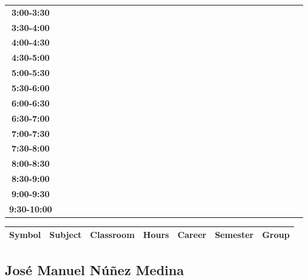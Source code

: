\documentclass{article}
\begin{document}
\begin{table}[ht]
\begin{tabular}{|c|c|c|c|c|c|c|c|c|c|c|c|c|c|c|c|c|c|c|c|c|c|c|c|c|c|c|c|c|c|}
\textbf{3:00-3:30} &   &   &   &   &   &   &   \\
 \cline{1-8} 
\textbf{3:30-4:00} &   &   &   &   &   &   &   \\
 \cline{1-8} 
\textbf{4:00-4:30} &   &   &   &   &   &   &   \\
 \cline{1-8} 
\textbf{4:30-5:00} &   &   &   &   &   &   &   \\
 \cline{1-8} 
\textbf{5:00-5:30} &   &   &   &   &   &   &   \\
 \cline{1-8} 
\textbf{5:30-6:00} &   &   &   &   &   &   &   \\
 \cline{1-8} 
\textbf{6:00-6:30} &   &   &   &   &   &   &   \\
 \cline{1-8} 
\textbf{6:30-7:00} &   &   &   &   &   &   &   \\
 \cline{1-8} 
\textbf{7:00-7:30} &   &   &   &   &   &   &   \\
 \cline{1-8} 
\textbf{7:30-8:00} &   &   &   &   &   &   &   \\
 \cline{1-8} 
\textbf{8:00-8:30} &   &   &   &   &   &   &   \\
 \cline{1-8} 
\textbf{8:30-9:00} &   &   &   &   &   &   &   \\
 \cline{1-8} 
\textbf{9:00-9:30} &   &   &   &   &   &   &   \\
 \cline{1-8} 
\textbf{9:30-10:00} &   &   &   &   &   &   &   \\
 \cline{1-8} 
\end{tabular}\end{table}

        
        \begin{tabular}{|>{\centering\arraybackslash}m{2cm}|>{\centering\arraybackslash}m{4cm}|>{\centering\arraybackslash}m{2cm}|>{\centering\arraybackslash}m{2cm}|>{\centering\arraybackslash}m{2cm}|>{\centering\arraybackslash}m{2cm}|>{\centering\arraybackslash}m{2cm}|}
        \hline
        \textbf{Symbol} & \textbf{Subject} & \textbf{Classroom} & \textbf{Hours} & \textbf{Career} & \textbf{Semester} & \textbf{Group} \\
        \hline
        \end{tabular}
                    

        \newpage
        

        \subsection{Jos\'e Manuel N\'u\~nez Medina}
        \vspace*{.1cm}
        
\end{document}
